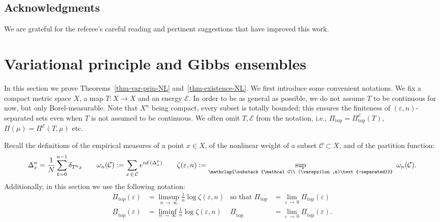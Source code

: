\documentclass[10pt]{amsart}
\theoremstyle{definition}\newtheorem{defi}[theo]{Definition}\newtheorem{rema}[theo]{Remark}\newtheorem{exam}[theo]{Example}\newtheorem{exem}[theo]{Example}\newtheorem{nota}[theo]{Notation}
\theoremstyle{plain}
\theoremstyle{plain}
\newcommand\eps{\varepsilon}
\newcommand\NLP{\Pi}
\renewcommand\top{{\mathrm{top}}}
\newcounter{In}
\newcommand*\8{\infty}
\newcommand{\En}{\mathcal{E}}
\newcommand{\cC}{\mathcal C}
\begin{document}
\subsection*{Acknowledgments}

We are grateful for the referee's careful reading and pertinent suggestions that have improved this work.



\section{Variational principle and Gibbs ensembles}\label{sec-th-AB}


In this section we prove Theorems~\ref{thm-var-prin-NL} and~\ref{thm-existence-NL}. We first introduce some convenient notations. We fix a compact metric space $X$, a map $T:X\to X$ and an energy $\En$. In order to be as general as possible, we do not assume $T$ to be continuous for now, but only Borel-measurable. Note that $X^n$ being compact, every subset is totally bounded; this ensures the finiteness of $(\eps,n)$-separated sets even when $T$ is not assumed to be continuous. We often omit $T,\En$ from the notation, i.e., $\NLP_\top = \NLP_\top^\En(T)$, $\NLP(\mu) = \NLP^\En(T,\mu)$ etc.


Recall the definitions of the empirical measures of a point $x\in X$, of the nonlinear weight of a subset $\cC\subset X$, and of the partition function:
\[
\Delta_x^n = \frac1N\sum_{k=0}^{n-1} \delta_{T^kx} \qquad
\omega_n(\cC) := \sum_{x\,\in\,\cC} e^{n\En(\Delta_x^n)} \qquad
\zeta(\eps,n) := \sup_{\mathclap{\substack{\cC \\ (\eps,n)\text{-separated}}}}\ \omega_n(\cC).
\]
Additionally, in this section we use the following notation:
\begin{align*}
\NLP_\top(\eps)&=\limsup_{n\,\to\,\infty} \frac1n \log \zeta(\eps,n) &
\text{so that }\NLP_\top &= \lim_{\eps\,\to\,0} \NLP_\top(\eps) \\
\underline{\NLP}_\top(\eps) &= \liminf_{n\,\to\,\infty} \frac1n \log \zeta(\eps,n) &\underline{\NLP}_\top &= \lim_{\eps\,\to\,0} \underline{\NLP}_\top(\eps).
\end{align*}


\end{document}
